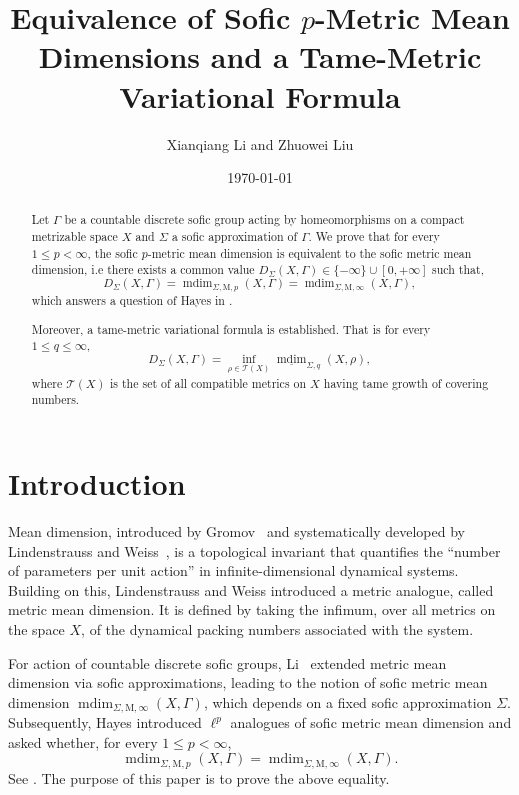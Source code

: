\documentclass[12pt]{amsart}
\title[Sofic $p$-metric mean dimension]{Equivalence of Sofic $p$-Metric Mean Dimensions and a Tame-Metric Variational Formula}
\author{Xianqiang Li and Zhuowei Liu}
\date{\today}
\theoremstyle{definition}
\theoremstyle{remark}
\newcommand{\mdim}{\operatorname{mdim}}
\begin{document}
\begin{abstract}
Let $\Gamma$ be a countable discrete sofic group acting by homeomorphisms on a compact metrizable
space $X$ and $\Sigma$ a sofic approximation of $\Gamma$. We prove that for every $1\leq p<\infty$, the sofic $p$-metric mean dimension is equivalent to
the sofic metric mean dimension, i.e there exists a common value
$ D_\Sigma(X,\Gamma)\in\{-\infty\}\cup[0,+\infty]$
such that,
$$D_\Sigma(X,\Gamma)=\mdim_{\Sigma,\mathrm M,p}(X,\Gamma)
 =\mdim_{\Sigma,\mathrm M,\infty}(X,\Gamma),$$
 which answers a question of Hayes in \cite[Question 3]{Hayes}.
 
Moreover, a tame-metric variational formula is established. That is  for every $1\leq q\leq\infty$,
$$
 D_\Sigma(X,\Gamma)
 =\inf_{\rho\in\mathcal T(X)}
 \underline{\mdim}_{\Sigma,q}(X,\rho),
$$
where $\mathcal T(X)$ is the set of all compatible metrics on $X$ having tame growth of covering numbers.
\end{abstract}

\maketitle

\section{Introduction}


Mean dimension, introduced by Gromov~\cite{MG} and systematically developed by Lindenstrauss and Weiss~\cite{LW}, is a topological invariant that quantifies the “number of parameters per unit action” in infinite-dimensional dynamical systems. Building on this, Lindenstrauss and Weiss introduced a metric analogue, called metric mean dimension. It is defined by taking the infimum, over all metrics on the space $X$, of the dynamical packing numbers associated with the system.

For action of countable discrete sofic groups, Li~\cite{Li} extended metric mean dimension via sofic approximations, leading to the notion of sofic metric mean dimension $\mdim_{\Sigma,\mathrm M,\infty}(X,\Gamma)$, which depends on a fixed sofic approximation $\Sigma$.
Subsequently, Hayes \cite{Hayes} introduced $\ell^p$ analogues of sofic metric mean dimension and asked whether, for every $1\leq p<\infty$,
\[
 \mdim_{\Sigma,\mathrm M,p}(X,\Gamma)
 =\mdim_{\Sigma,\mathrm M,\infty}(X,\Gamma).
\]
See \cite[Question 3]{Hayes}. The purpose of this paper is to prove the above equality.
\end{document}
